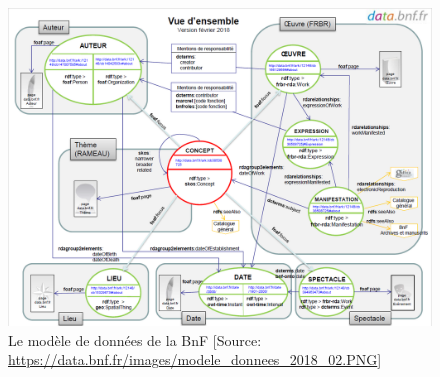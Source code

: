 \begin{figure}[!h]
	\centering
	\includegraphics[width=17cm]{images/mdd_bnf.PNG}
	\caption[Le modèle de données de la BnF]{Le modèle de données de la BnF [Source: \url{https://data.bnf.fr/images/modele_donnees_2018_02.PNG}]}
	\label{mdd_bnf}
\end{figure}